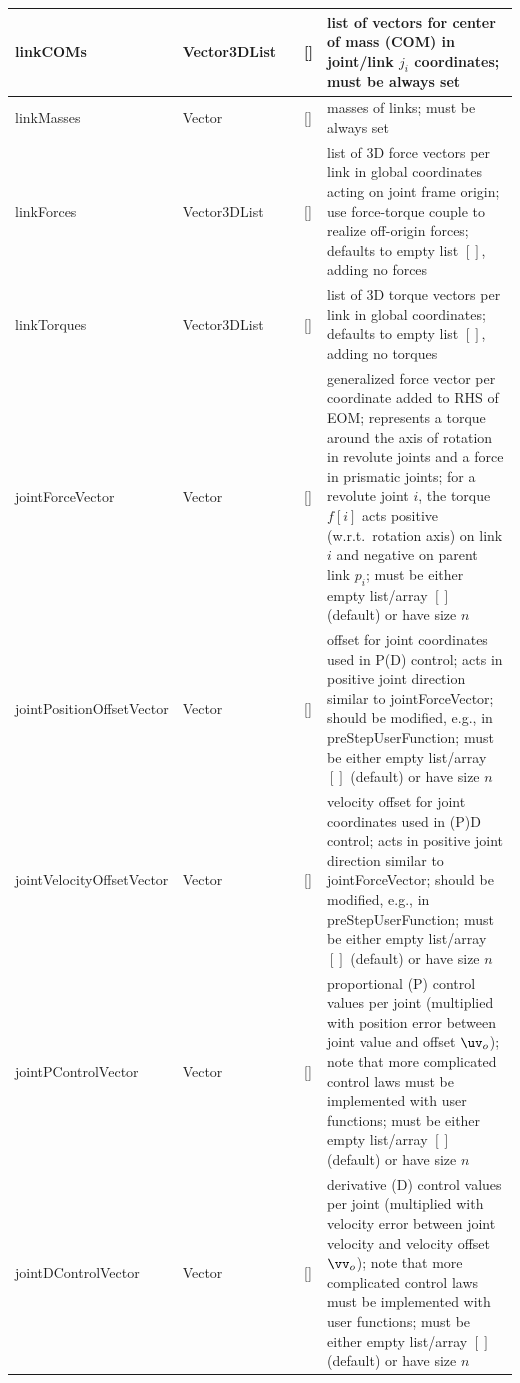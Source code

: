 \begin{center}
\begin{longtable}{| p{4.5cm} | p{2.5cm} | p{0.5cm} | p{2.5cm} | p{6cm} |}
    linkCOMs &     Vector3DList &      &     [] &     list of vectors for center of mass (COM) in joint/link $j_i$ coordinates; must be always set\\ \hline
    linkMasses &     Vector &      &     [] &     masses of links; must be always set\\ \hline
    linkForces &     Vector3DList &      &     [] &     list of 3D force vectors per link in global coordinates acting on joint frame origin; use force-torque couple to realize off-origin forces; defaults to empty list $[]$, adding no forces\\ \hline
    linkTorques &     Vector3DList &      &     [] &     list of 3D torque vectors per link in global coordinates; defaults to empty list $[]$, adding no torques\\ \hline
    jointForceVector &     Vector &      &     [] &     generalized force vector per coordinate added to RHS of EOM; represents a torque around the axis of rotation in revolute joints and a force in prismatic joints; for a revolute joint $i$, the torque $f[i]$ acts positive (w.r.t.\ rotation axis) on link $i$ and negative on parent link $p_i$; must be either empty list/array $[]$ (default) or have size $n$\\ \hline
    jointPositionOffsetVector &     Vector &      &     [] &     offset for joint coordinates used in P(D) control; acts in positive joint direction similar to jointForceVector; should be modified, e.g., in preStepUserFunction; must be either empty list/array $[]$ (default) or have size $n$\\ \hline
    jointVelocityOffsetVector &     Vector &      &     [] &     velocity offset for joint coordinates used in (P)D control; acts in positive joint direction similar to jointForceVector; should be modified, e.g., in preStepUserFunction; must be either empty list/array $[]$ (default) or have size $n$\\ \hline
    jointPControlVector &     Vector &      &     [] &     proportional (P) control values per joint (multiplied with position error between joint value and offset $\uv_o$); note that more complicated control laws must be implemented with user functions; must be either empty list/array $[]$ (default) or have size $n$\\ \hline
    jointDControlVector &     Vector &      &     [] &     derivative (D) control values per joint (multiplied with velocity error between joint velocity and velocity offset $\vv_o$); note that more complicated control laws must be implemented with user functions; must be either empty list/array $[]$ (default) or have size $n$\\ \hline

\end{longtable}
\end{center}
